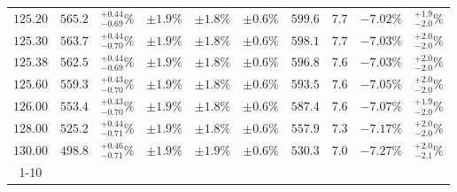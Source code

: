 \begin{table}[ht!]
{{\begin{tabular}{| cc | c | ccc | ccc | c |}
$125.20$ & $565.2$ & $^{+0.44}_{-0.69}\%$ & $\pm 1.9\%$ & {\color{black!55}$\pm 1.8\%$} & {\color{black!55}$\pm 0.6\%$} & $599.6$ & $7.7$ & $-7.02\%$ & $^{+1.9}_{-2.0}\%$ \\
$125.30$ & $563.7$ & $^{+0.44}_{-0.70}\%$ & $\pm 1.9\%$ & {\color{black!55}$\pm 1.8\%$} & {\color{black!55}$\pm 0.6\%$} & $598.1$ & $7.7$ & $-7.03\%$ & $^{+2.0}_{-2.0}\%$ \\
$125.38$ & $562.5$ & $^{+0.44}_{-0.69}\%$ & $\pm 1.9\%$ & {\color{black!55}$\pm 1.8\%$} & {\color{black!55}$\pm 0.6\%$} & $596.8$ & $7.6$ & $-7.03\%$ & $^{+2.0}_{-2.0}\%$ \\
$125.60$ & $559.3$ & $^{+0.43}_{-0.70}\%$ & $\pm 1.9\%$ & {\color{black!55}$\pm 1.8\%$} & {\color{black!55}$\pm 0.6\%$} & $593.5$ & $7.6$ & $-7.05\%$ & $^{+2.0}_{-2.0}\%$ \\
$126.00$ & $553.4$ & $^{+0.43}_{-0.70}\%$ & $\pm 1.9\%$ & {\color{black!55}$\pm 1.8\%$} & {\color{black!55}$\pm 0.6\%$} & $587.4$ & $7.6$ & $-7.07\%$ & $^{+1.9}_{-2.0}\%$ \\
$128.00$ & $525.2$ & $^{+0.44}_{-0.71}\%$ & $\pm 1.9\%$ & {\color{black!55}$\pm 1.8\%$} & {\color{black!55}$\pm 0.6\%$} & $557.9$ & $7.3$ & $-7.17\%$ & $^{+2.0}_{-2.0}\%$ \\
$130.00$ & $498.8$ & $^{+0.46}_{-0.71}\%$ & $\pm 1.9\%$ & {\color{black!55}$\pm 1.9\%$} & {\color{black!55}$\pm 0.6\%$} & $530.3$ & $7.0$ & $-7.27\%$ & $^{+2.0}_{-2.1}\%$ \\
\cline{1-10}
\end{tabular}
}
}
\end{table}

